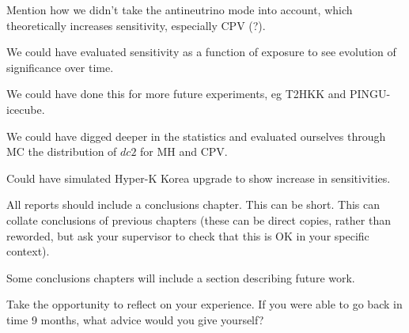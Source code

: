 \label{ch:conclusion}
Mention how we didn't take the antineutrino mode into account, which
theoretically increases sensitivity, especially CPV (?).  

We could have evaluated sensitivity as a function of exposure to see evolution
of significance over time.

We could have done this for more future experiments, eg T2HKK and PINGU-icecube.

We could have digged deeper in the statistics and evaluated ourselves through
MC the distribution of $dc2$ for MH and CPV.

Could have simulated Hyper-K Korea upgrade to show increase in sensitivities.


All reports should include a conclusions chapter. This can be short. This can collate conclusions of previous chapters (these can be direct copies, rather than reworded, but ask your supervisor to check that this is OK in your specific context).

Some conclusions chapters will include a section describing future work. 

Take the opportunity to reflect on your experience. If you were able to go back in time 9 months, what advice would you give yourself?
